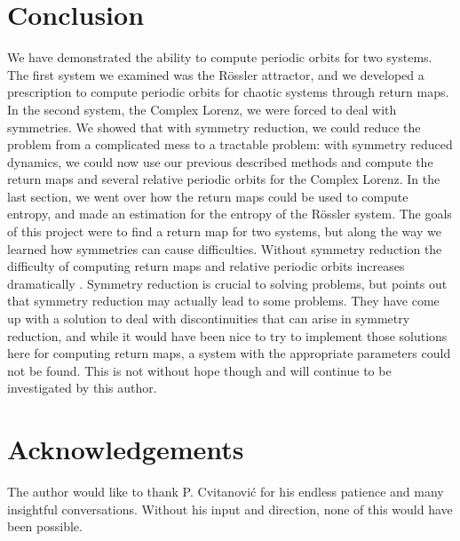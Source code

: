 \documentclass[12 pt]{article}
\begin{document}
\section{Conclusion}
We have demonstrated the ability to compute periodic orbits for two systems.  The first system we examined was the R\"ossler attractor, and we developed a prescription to compute periodic orbits for chaotic systems through return maps.  In the second system, the Complex Lorenz, we were forced to deal with symmetries.  We showed that with symmetry reduction, we could reduce the problem from a complicated mess to a tractable problem: with symmetry reduced dynamics, we could now use our previous described methods and compute the return maps and several relative periodic orbits for the Complex Lorenz.  In the last section, we went over how the return maps could be used to compute entropy, and made an estimation for the entropy of the R\"ossler system.  The goals of this project were to find a return map for two systems, but along the way we learned how symmetries can cause difficulties.  Without symmetry reduction the difficulty of computing return maps and relative periodic orbits increases dramatically \cite{Eth}.  Symmetry reduction is crucial to solving problems, but \cite{Atl} points out that symmetry reduction may actually lead to some problems.  They have come up with a solution to deal with discontinuities that can arise in symmetry reduction, and while it would have been nice to try to implement those solutions here for computing return maps, a system with the appropriate parameters could not be found.  This is not without hope though and will continue to be investigated by this author.

\section{Acknowledgements}
The author would like to thank P. Cvitanovi\'c for his endless patience and many insightful conversations.  Without his input and direction, none of this would have been possible.
\end{document}
